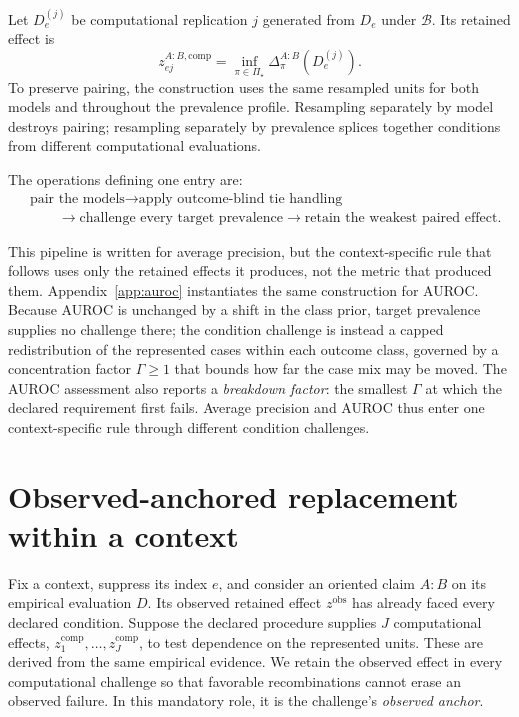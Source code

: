 \documentclass[11pt]{article}
\newcommand{\PSet}{\Pi_\star}
\newcommand{\Boot}{\mathcal{B}}
\theoremstyle{remark}
\begin{document}
Let $D_e^{(j)}$ be computational replication $j$ generated from $D_e$ under
$\Boot$. Its retained effect is
\begin{equation}
z_{ej}^{A:B,\mathrm{comp}}
=
\inf_{\pi\in\PSet}\Delta^{A:B}_\pi(D_e^{(j)}).
\label{eq:computational-retained}
\end{equation}
To preserve pairing, the construction uses the same resampled units for both
models and throughout the prevalence profile. Resampling separately by model
destroys pairing; resampling separately by prevalence splices together
conditions from different computational evaluations.

The operations defining one entry are:
\[
\begin{aligned}
&\text{pair the models}
\longrightarrow
\text{apply outcome-blind tie handling}\\
&\qquad\longrightarrow
\text{challenge every target prevalence}
\longrightarrow
\text{retain the weakest paired effect}.
\end{aligned}
\]

This pipeline is written for average precision, but the context-specific rule that follows
uses only the retained effects it produces, not the metric that produced them.
Appendix~\ref{app:auroc} instantiates the same construction for AUROC. Because
AUROC is unchanged by a shift in the class prior, target prevalence supplies no
challenge there; the condition challenge is instead a capped redistribution of
the represented cases within each outcome class, governed by a concentration
factor $\Gamma\geq1$ that bounds how far the case mix may be moved. The AUROC
assessment also reports a \emph{breakdown factor}: the smallest
$\Gamma$ at which the declared requirement first fails. Average precision and
AUROC thus enter one context-specific rule through different condition challenges.

\section{Observed-anchored replacement within a context}
\label{sec:context-rule}

Fix a context, suppress its index $e$, and consider an oriented claim $A:B$
on its empirical evaluation $D$. Its observed
retained effect $z^{\mathrm{obs}}$ has already faced every declared condition.
Suppose the declared procedure supplies $J$ computational effects,
$z_1^{\mathrm{comp}},\ldots,z_J^{\mathrm{comp}}$, to test dependence on
the represented units. These are derived from the same empirical evidence.
We retain the observed effect in every computational challenge so that
favorable recombinations cannot erase an observed failure. In this mandatory
role, it is the challenge's \emph{observed anchor}.
\end{document}
